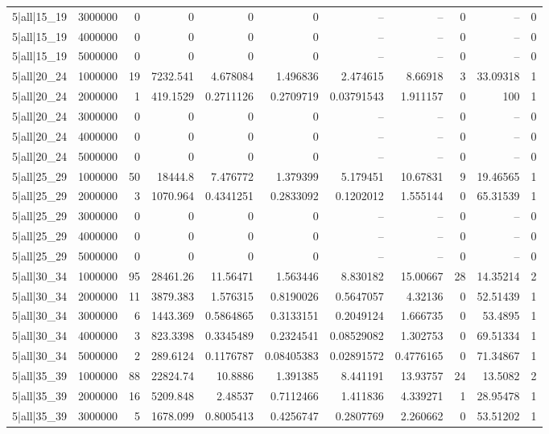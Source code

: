 \begin{tabular}{lrrrrrrrrrr}
5|all|15\_19 & 3000000 & 0 & 0 & 0 & 0 & -- & -- & 0 & -- & 0 \\
5|all|15\_19 & 4000000 & 0 & 0 & 0 & 0 & -- & -- & 0 & -- & 0 \\
5|all|15\_19 & 5000000 & 0 & 0 & 0 & 0 & -- & -- & 0 & -- & 0 \\
5|all|20\_24 & 1000000 & 19 & 7232.541 & 4.678084 & 1.496836 & 2.474615 & 8.66918 & 3 & 33.09318 & 1 \\
5|all|20\_24 & 2000000 & 1 & 419.1529 & 0.2711126 & 0.2709719 & 0.03791543 & 1.911157 & 0 & 100 & 1 \\
5|all|20\_24 & 3000000 & 0 & 0 & 0 & 0 & -- & -- & 0 & -- & 0 \\
5|all|20\_24 & 4000000 & 0 & 0 & 0 & 0 & -- & -- & 0 & -- & 0 \\
5|all|20\_24 & 5000000 & 0 & 0 & 0 & 0 & -- & -- & 0 & -- & 0 \\
5|all|25\_29 & 1000000 & 50 & 18444.8 & 7.476772 & 1.379399 & 5.179451 & 10.67831 & 9 & 19.46565 & 1 \\
5|all|25\_29 & 2000000 & 3 & 1070.964 & 0.4341251 & 0.2833092 & 0.1202012 & 1.555144 & 0 & 65.31539 & 1 \\
5|all|25\_29 & 3000000 & 0 & 0 & 0 & 0 & -- & -- & 0 & -- & 0 \\
5|all|25\_29 & 4000000 & 0 & 0 & 0 & 0 & -- & -- & 0 & -- & 0 \\
5|all|25\_29 & 5000000 & 0 & 0 & 0 & 0 & -- & -- & 0 & -- & 0 \\
5|all|30\_34 & 1000000 & 95 & 28461.26 & 11.56471 & 1.563446 & 8.830182 & 15.00667 & 28 & 14.35214 & 2 \\
5|all|30\_34 & 2000000 & 11 & 3879.383 & 1.576315 & 0.8190026 & 0.5647057 & 4.32136 & 0 & 52.51439 & 1 \\
5|all|30\_34 & 3000000 & 6 & 1443.369 & 0.5864865 & 0.3133151 & 0.2049124 & 1.666735 & 0 & 53.4895 & 1 \\
5|all|30\_34 & 4000000 & 3 & 823.3398 & 0.3345489 & 0.2324541 & 0.08529082 & 1.302753 & 0 & 69.51334 & 1 \\
5|all|30\_34 & 5000000 & 2 & 289.6124 & 0.1176787 & 0.08405383 & 0.02891572 & 0.4776165 & 0 & 71.34867 & 1 \\
5|all|35\_39 & 1000000 & 88 & 22824.74 & 10.8886 & 1.391385 & 8.441191 & 13.93757 & 24 & 13.5082 & 2 \\
5|all|35\_39 & 2000000 & 16 & 5209.848 & 2.48537 & 0.7112466 & 1.411836 & 4.339271 & 1 & 28.95478 & 1 \\
5|all|35\_39 & 3000000 & 5 & 1678.099 & 0.8005413 & 0.4256747 & 0.2807769 & 2.260662 & 0 & 53.51202 & 1 \\

\end{tabular}
